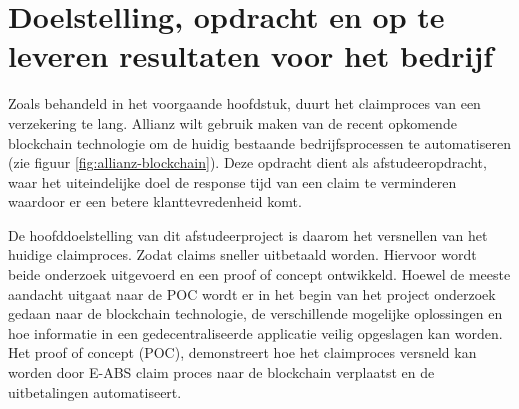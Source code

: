 \chapter{Doelstelling, opdracht en op te leveren resultaten voor het bedrijf}
Zoals behandeld in het voorgaande hoofdstuk, duurt het claimproces van een verzekering te lang. Allianz wilt gebruik maken van de recent opkomende blockchain technologie om de huidig bestaande bedrijfsprocessen te automatiseren (zie figuur \ref{fig:allianz-blockchain}). Deze opdracht dient als afstudeeropdracht, waar het uiteindelijke doel de response tijd van een claim te verminderen waardoor er een betere klanttevredenheid komt.\par

De hoofddoelstelling van dit afstudeerproject is daarom het versnellen van het huidige claimproces. Zodat claims sneller uitbetaald worden. Hiervoor wordt beide onderzoek uitgevoerd en een proof of concept ontwikkeld. Hoewel de meeste aandacht uitgaat naar de POC wordt er in het begin van het project onderzoek gedaan naar de blockchain technologie, de verschillende mogelijke oplossingen en hoe informatie in een gedecentraliseerde applicatie veilig opgeslagen kan worden. Het proof of concept (POC), demonstreert hoe het claimproces versneld kan worden door E-ABS claim proces naar de blockchain verplaatst en de uitbetalingen automatiseert.\\


